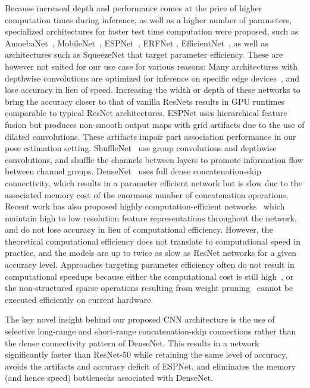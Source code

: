\documentclass[acmtog,authorversion]{acmart}
\newcommand{\change}[1]{{{#1}}}
\begin{document}
Because increased depth and performance comes at the price of higher computation times during inference, \change{as well as a higher number of parameters}, specialized architectures for faster test time computation were proposed, such as AmoebaNet~\cite{real2018regularized}, MobileNet~\cite{sandler2018mobilenetv2,howard2019searching}, ESPNet~\cite{mehta2018espnet}, ERFNet \cite{romera2018erfnet}, \change{EfficientNet~\cite{tan2019efficientnet}, as well as architectures such as SqueezeNet\cite{SqueezeNet} that target parameter efficiency.} These are however not suited for our use case for various reasons: 
Many architectures with depthwise convolutions are optimized for inference on specific edge devices~\cite{sandler2018mobilenetv2}, and lose accuracy in lieu of speed. Increasing the width or depth of these networks \cite{howard2019searching,tan2019efficientnet} to bring the accuracy closer to that of vanilla ResNets results in GPU runtimes comparable to typical ResNet architectures.
ESPNet uses hierarchical feature fusion but 
produces non-smooth output maps with grid artifacts due to the use of dilated convolutions. These artifacts impair part association performance in our pose estimation setting.
\change{ShuffleNet~\cite{zhang2018shufflenet,ma2018shufflenet} use group convolutions and depthwise convolutions, and shuffle the channels between layers to promote information flow between channel groups.}
DenseNet~\cite{huang2017densely} 
uses full dense concatenation-skip connectivity, which results in a parameter efficient network but is slow due to the associated memory cost of the enormous number of concatenation operations.
\change{Recent work has also proposed highly computation-efficient networks~\cite{WangSCJDZLMTWLX19,SunXLW19} which maintain high to low resolution feature representations throughout the network, and do not lose accuracy in lieu of computational efficiency. However, the theoretical computational efficiency does not translate to computational speed in practice, and the models are up to twice as slow as ResNet networks for a given accuracy level. Approaches targeting parameter efficiency often do not result in computational speedups because either the computational cost is still high~\cite{SqueezeNet}, or the non-structured sparse operations resulting from weight pruning~\cite{frankle2018lottery} cannot be executed efficiently on current hardware.}


The key novel insight behind our proposed CNN architecture is the use of selective long-range and short-range concatenation-skip connections rather than the dense connectivity pattern of DenseNet. 
This results in a network significantly faster than ResNet-50 while retaining the same level of accuracy, avoids the artifacts and accuracy deficit of ESPNet, and eliminates the memory (and hence speed) bottlenecks associated with DenseNet. 
\end{document}
